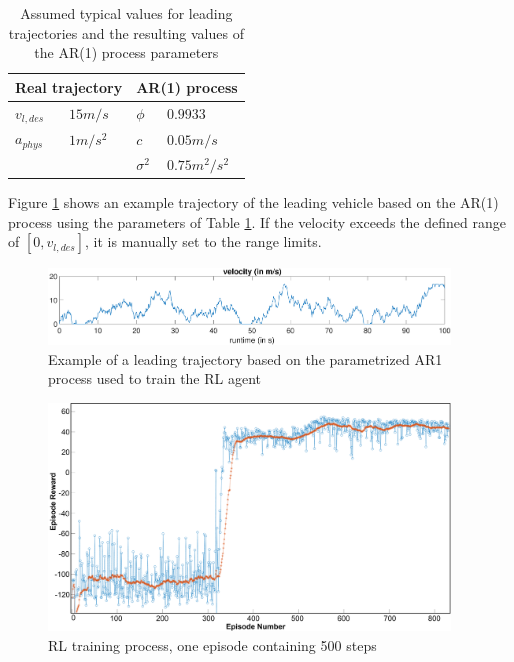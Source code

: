 \documentclass[review]{elsarticle}
\begin{document}
\begin{table}
	\caption{Assumed typical values for leading trajectories and the resulting values of the AR(1) process parameters} 
	\label{tab:AR1Parameters} 
	\begin{center}
		\begin{tabular}{ p{} p{} |p{} p{}  }
			 \multicolumn{2}{c|}{Real trajectory} & \multicolumn{2}{c}{AR(1) process}   \\ \hline
			$v_{l,des}$ &$15m/s$ &$\phi$ & $0.9933$\\
			$a_{phys}$ &$1m/s^2$ &$c$ & $0.05m/s$\\
			& & $\sigma^2$ & $0.75m^2/s^2$
			
		\end{tabular}
	\end{center}
\end{table}

Figure \ref{fig:AR1process} shows an example trajectory of the leading vehicle based on the AR(1) process using the parameters of Table \ref{tab:AR1Parameters}. If the velocity exceeds the defined range of $[0, v_{l,des}]$, it is manually set to the range limits.
\begin{figure}
	\centering
	\includegraphics[width=0.95\textwidth]{images/AR1process}
	\caption{Example of a leading trajectory based on the parametrized AR1 process used to train the RL agent}
	\label{fig:AR1process}
\end{figure}


\begin{figure}
	\centering
	\includegraphics[width=0.95\textwidth]{images/Training}
	\caption{RL training process, one episode containing 500 steps}
	\label{fig:training}
\end{figure}
\end{document}
